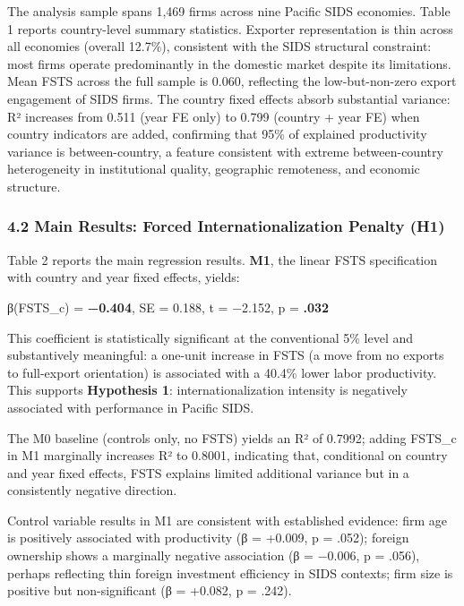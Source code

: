 \documentclass[12pt,a4paper]{article}
\begin{document}
The analysis sample spans 1,469 firms across nine Pacific SIDS
economies. Table 1 reports country-level summary statistics. Exporter
representation is thin across all economies (overall 12.7\%), consistent
with the SIDS structural constraint: most firms operate predominantly in
the domestic market despite its limitations. Mean FSTS across the full
sample is 0.060, reflecting the low-but-non-zero export engagement of
SIDS firms. The country fixed effects absorb substantial variance: R²
increases from 0.511 (year FE only) to 0.799 (country + year FE) when
country indicators are added, confirming that 95\% of explained
productivity variance is between-country, a feature consistent with
extreme between-country heterogeneity in institutional quality,
geographic remoteness, and economic structure.

\hypertarget{42-main-results-forced-internationalization-penalty-h1}{%
\subsubsection{4.2 Main Results: Forced Internationalization Penalty
(H1)}\label{42-main-results-forced-internationalization-penalty-h1}}

Table 2 reports the main regression results. \textbf{M1}, the linear
FSTS specification with country and year fixed effects, yields:

β(FSTS\_c) = \textbf{−0.404}, SE = 0.188, t = −2.152, p = \textbf{.032}

This coefficient is statistically significant at the conventional 5\%
level and substantively meaningful: a one-unit increase in FSTS (a move
from no exports to full-export orientation) is associated with a 40.4\%
lower labor productivity. This supports \textbf{Hypothesis 1}:
internationalization intensity is negatively associated with performance
in Pacific SIDS.

The M0 baseline (controls only, no FSTS) yields an R² of 0.7992; adding
FSTS\_c in M1 marginally increases R² to 0.8001, indicating that,
conditional on country and year fixed effects, FSTS explains limited
additional variance but in a consistently negative direction.

Control variable results in M1 are consistent with established evidence:
firm age is positively associated with productivity (β = +0.009, p =
.052); foreign ownership shows a marginally negative association (β =
−0.006, p = .056), perhaps reflecting thin foreign investment efficiency
in SIDS contexts; firm size is positive but non-significant (β = +0.082,
p = .242).
\end{document}
